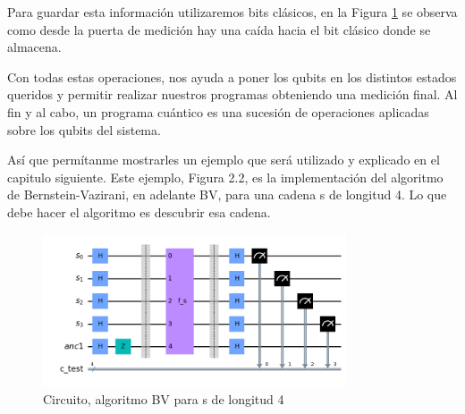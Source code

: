  Para guardar esta información utilizaremos bits clásicos, en la Figura \ref{Fig:CircuitoBV} se observa como desde la puerta de medición hay una caída hacia el bit clásico donde se almacena. \newline
 
 Con todas estas operaciones, nos ayuda a poner los qubits en los distintos estados queridos y permitir realizar nuestros programas obteniendo una medición final. Al fin y al cabo, un programa cuántico es una sucesión de operaciones aplicadas sobre los qubits del sistema. \newline

  Así que permítanme mostrarles un ejemplo que será utilizado y explicado en el capitulo siguiente. Este ejemplo, Figura 2.2, es la implementación del algoritmo de Bernstein-Vazirani, en adelante BV, para una cadena s de longitud 4. Lo que debe hacer el algoritmo es descubrir esa cadena.

   \begin{figure}[H]
    \centering
    \includegraphics[width=0.8\textwidth]{TFG/imagenes/BV_circuito.png}
    \caption{Circuito, algoritmo BV para s de longitud 4}
    \label{Fig:CircuitoBV}
 \end{figure}

